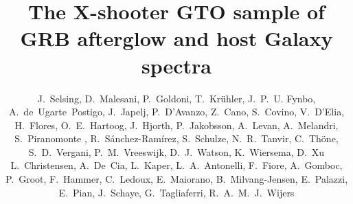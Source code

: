 \documentclass[iop, twocolappendix, numberedappendix, tighten, appendixfloats]{emulateapj}
\begin{document}
	
	\title{\vspace{-0.5cm}The X-shooter GTO sample of GRB afterglow and host Galaxy spectra}
	
	\author{
		J.~Selsing, 
		D.~Malesani, 
		P.~Goldoni, 
		T.~Kr\"{u}hler, 
		J.~P.~U. Fynbo, 
		A.~de~Ugarte~Postigo, 
		J.~Japelj,
		P.~D'Avanzo,
		Z.~Cano,
		S.~Covino, 
		V.~D'Elia, 
		H.~Flores,
		O.~E.~Hartoog,
		J.~Hjorth, 
		P.~Jakobsson, 
		A.~Levan,
		A.~Melandri,
		S.~Piranomonte ,
		R.~S\'anchez-Ram\'irez,
		S.~Schulze, 
		N.~R.~Tanvir,
		C.~Th{\"o}ne,
		S.~D.~Vergani,
		P.~M.~Vreeswijk, 
		D.~J.~Watson,
		K.~Wiersema,
		D.~Xu
		L.~Christensen,
		A.~De~Cia, 
		L.~Kaper, 
		L.~A.~Antonelli,
		F.~Fiore,
		A.~Gomboc,
		P.~Groot,
		F.~Hammer,
		C.~Ledoux, 
		E.~Maiorano,
		B.~Milvang-Jensen, 
		E.~Palazzi,
		E.~Pian,
		J.~Schaye,
		G.~Tagliaferri,
		R.~A.~M.~J.~Wijers
	}
	
\end{document}
